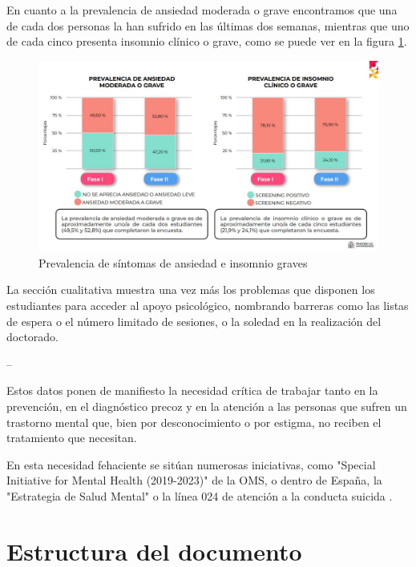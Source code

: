 En cuanto a la prevalencia de ansiedad moderada o grave encontramos que una de cada dos personas la han sufrido en las últimas dos semanas, mientras que uno de cada cinco presenta insomnio clínico o grave, como se puede ver en la figura \ref{fig:intro:sintomas_ansiedad_insomnio}. 

\begin{figure}[h]
    \centering
    \includegraphics[width=0.75\linewidth]{figures/Sintomas ansiedad insomnio.JPG}
    \caption[Prevalencia de síntomas de ansiedad e insomnio graves]{Prevalencia de síntomas de ansiedad e insomnio graves \cite{ministerio_de_universidades_salud_2023}}
    \label{fig:intro:sintomas_ansiedad_insomnio}
\end{figure}

La sección cualitativa muestra una vez más los problemas que disponen los estudiantes para acceder al apoyo psicológico, nombrando barreras como las listas de espera o el número limitado de sesiones, o la soledad en la realización del doctorado.

--

Estos datos ponen de manifiesto la necesidad crítica de trabajar tanto en la prevención, en el diagnóstico precoz y en la atención a las personas que sufren un trastorno mental que, bien por desconocimiento o por estigma, no reciben el tratamiento que necesitan.

En esta necesidad fehaciente se sitúan numerosas iniciativas, como "Special Initiative for Mental Health (2019-2023)" \cite{oms_salud_nodate} de la OMS, o dentro de España, la "Estrategia de Salud Mental" o la línea 024 de atención a la conducta suicida \cite{la_moncloa_minones_2023}.


\section{Estructura del documento}


